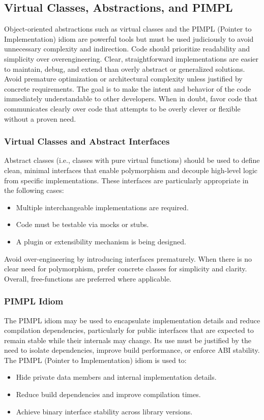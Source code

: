 \subsection{Virtual Classes, Abstractions, and PIMPL}

Object-oriented abstractions such as virtual classes and the PIMPL (Pointer to Implementation) idiom are powerful tools but must be used judiciously to avoid unnecessary complexity and indirection. Code should prioritize readability and simplicity over overengineering. Clear, straightforward implementations are easier to maintain, debug, and extend than overly abstract or generalized solutions. Avoid premature optimization or architectural complexity unless justified by concrete requirements. The goal is to make the intent and behavior of the code immediately understandable to other developers. When in doubt, favor code that communicates clearly over code that attempts to be overly clever or flexible without a proven need.

\subsubsection*{Virtual Classes and Abstract Interfaces}

Abstract classes (i.e., classes with pure virtual functions) should be used to define clean, minimal interfaces that enable polymorphism and decouple high-level logic from specific implementations. These interfaces are particularly appropriate in the following cases:
\begin{itemize}
    \item Multiple interchangeable implementations are required.
    \item Code must be testable via mocks or stubs.
    \item A plugin or extensibility mechanism is being designed.
\end{itemize}
Avoid over-engineering by introducing interfaces prematurely. When there is no clear need for polymorphism, prefer concrete classes for simplicity and clarity. Overall, free-functions are preferred where applicable.

\subsubsection*{PIMPL Idiom}

The PIMPL idiom may be used to encapsulate implementation details and reduce compilation dependencies, particularly for public interfaces that are expected to remain stable while their internals may change. Its use must be justified by the need to isolate dependencies, improve build performance, or enforce ABI stability. The PIMPL (Pointer to Implementation) idiom is used to:
\begin{itemize}
    \item Hide private data members and internal implementation details.
    \item Reduce build dependencies and improve compilation times.
    \item Achieve binary interface stability across library versions.
\end{itemize}

